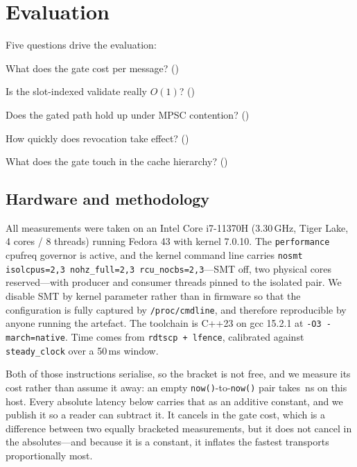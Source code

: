 \section{Evaluation}
\label{sec:eval}

Five questions drive the evaluation:

\begin{description}
\itemsep0pt
\item[Q1] What does the gate cost per message? ()
\item[Q2] Is the slot-indexed validate really $O(1)$? ()
\item[Q3] Does the gated path hold up under MPSC contention?
          ()
\item[Q4] How quickly does revocation take effect?
          ()
\item[Q5] What does the gate touch in the cache hierarchy?
          ()
\end{description}

\subsection{Hardware and methodology}
\label{sec:eval:hw}

All measurements were taken on an Intel Core i7-11370H (3.30\,GHz,
Tiger Lake, 4 cores / 8 threads) running Fedora 43 with kernel 7.0.10.
The \texttt{performance} cpufreq governor is active, and the kernel
command line carries
\texttt{nosmt isolcpus=2,3 nohz\_full=2,3 rcu\_nocbs=2,3}---SMT off,
two physical cores reserved---with producer and consumer threads
pinned to the isolated pair. We disable SMT by kernel parameter
rather than in firmware so that the configuration is fully captured
by \texttt{/proc/cmdline}, and therefore reproducible by anyone
running the artefact. The toolchain is
C++23 on gcc 15.2.1 at \texttt{-O3 -march=native}. Time comes from
\texttt{rdtscp + lfence}, calibrated against \texttt{steady\_clock}
over a 50\,ms window.

Both of those instructions serialise, so the bracket is not free, and we
measure its cost rather than assume it away: an empty
\texttt{now()}-to-\texttt{now()} pair takes \timerFloor\,ns on this
host. Every absolute latency below carries that as an additive constant,
and we publish it so a reader can subtract it. It cancels in the gate
cost, which is a difference between two equally bracketed measurements,
but it does not cancel in the absolutes---and because it is a constant,
it inflates the fastest transports proportionally most.

